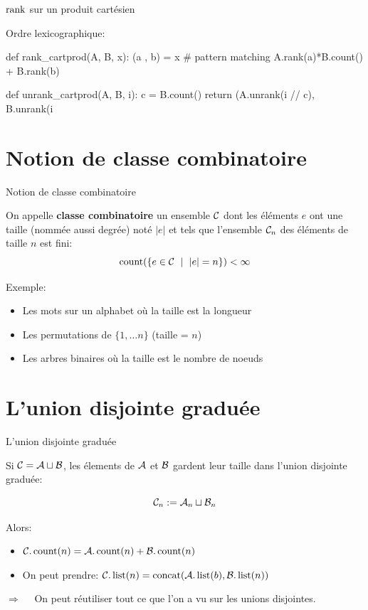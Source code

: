 \documentclass{beamer}
\begin{document}
\begin{frame}[fragile]{$\operatorname{rank}$ sur un produit cartésien}

  Ordre lexicographique:
  \bigskip
\begin{listing}{1}
    def rank_cartprod(A, B, x):
        (a , b) = x      # pattern matching
        A.rank(a)*B.count() + B.rank(b)

    def unrank_cartprod(A, B, i):
        c = B.count()
        return (A.unrank(i // c), B.unrank(i %
\end{listing}
\end{frame}


\section{Notion de classe combinatoire}

\begin{frame}{Notion de classe combinatoire}
  \begin{DEFN}
    On appelle \textbf{classe combinatoire} un ensemble $\mathcal{C}$ dont les éléments
    $e$ ont une taille (nommée aussi degrée) noté $|e|$ et tels que l'ensemble
    $\mathcal{C}_n$ des éléments de taille $n$ est fini:
    \[
    \operatorname{count}(\{e\in \mathcal{C}\ \mid\ |e| = n\}) < \infty
    \]
  \end{DEFN}
  Exemple:
  \begin{itemize}
  \item Les mots sur un alphabet où la taille est la longueur
  \item Les permutations de $\{1,\dots n\}$ (taille = $n$)
  \item Les arbres binaires où la taille est le nombre de noeuds
  \end{itemize}
\end{frame}

\section{L'union disjointe graduée}
\begin{frame}{L'union disjointe graduée}

  Si $\mathcal{C} = \mathcal{A} \sqcup \mathcal{B}$, les élements de $\mathcal{A}$ et $\mathcal{B}$ gardent leur
  taille dans l'union disjointe graduée:

  \[\mathcal{C}_n := \mathcal{A}_n \sqcup \mathcal{B}_n\]

  Alors:
  \begin{itemize}
  \item $\mathcal{C}.\operatorname{count}(n) = \mathcal{A}.\operatorname{count}(n) + \mathcal{B}.\operatorname{count}(n)$
  \item On peut prendre: $\mathcal{C}.\operatorname{list}(n) = \operatorname{concat}(\mathcal{A}.\operatorname{list}(b), \mathcal{B}.\operatorname{list}(n))$
  \end{itemize}
  \bigskip\pause

  $\Longrightarrow\quad$ On peut réutiliser tout ce que l'on a vu sur les
  unions disjointes.
\end{frame}
\end{document}
